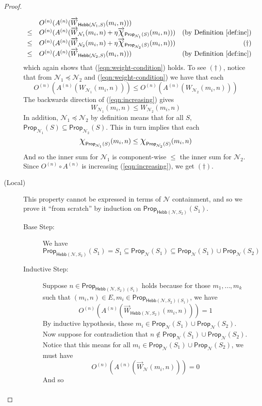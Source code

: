 \documentclass[letterpaper]{article}
\theoremstyle{definition}
\newcommand*{\bigchi}{\mbox{\Large$\chi$}}%
\newcommand{\Prop}{\textsf{Prop}}
\newcommand{\Inc}{\textsf{Hebb}}
\newcommand{\Net}{\mathcal{N}}
\begin{document}
\begin{proof}
\begin{description}
\[\begin{array}{llr}
    &
    O^{(n)}(A^{(n)}(\overrightarrow{W}_{\Inc(\Net_1, S)}(m_i, n))) & 
    \\
    
    \leq &
    O^{(n)}(A^{(n)}(\overrightarrow{W}_{\Net_1}(m_i, n) + \eta \overrightarrow{\bigchi}_{\Prop_{\Net_1}(S)}(m_i, n))) & 
    \mbox{(by Definition~\ref{def:inc})}\\
    
    \leq &
    O^{(n)}(A^{(n)}(\overrightarrow{W}_{\Net_2}(m_i, n) + \eta \overrightarrow{\bigchi}_{\Prop_{\Net_2}(S)}(m_i, n))) & 
    (\dagger)\\
    
    \leq &
    O^{(n)}(A^{(n)}(\overrightarrow{W}_{\Inc(\Net_2, S)}(m_i, n))) & 
    \mbox{(by Definition~\ref{def:inc})}
    \end{array}
    \]
    which again shows that (\ref{eqn:weight-condition}) holds.  To see $(\dagger)$, notice that from $\Net_1 \preceq \Net_2$ and (\ref{eqn:weight-condition}) we have that each
    \[
    O^{(n)}(A^{(n)}(W_{\Net_1}(m_i, n))) \leq O^{(n)}(A^{(n)}(W_{\Net_2}(m_i, n)))
    \]
    The backwards direction of (\ref{eqn:increasing}) gives
    \[
    W_{\Net_1}(m_i, n) \leq W_{\Net_2}(m_i, n)
    \]
    In addition, $\Net_1 \preceq \Net_2$ by definition means that for all $S$, $\Prop_{\Net_1}(S) \subseteq \Prop_{\Net_2}(S)$.  This in turn implies that each
    \[
    \bigchi_{\Prop_{\Net_1}(S)}(m_i, n) \leq \bigchi_{\Prop_{\Net_2}(S)}(m_i, n)
    \]
    And so the inner sum for $\Net_1$ is component-wise $\leq$ the inner sum for $\Net_2$.  Since ${O^{(n)} \circ A^{(n)}}$ is increasing (\ref{eqn:increasing}), we get $(\dagger)$.
    
    \item[(Local)]
    This property cannot be expressed in terms of $\Net$ containment, and so we prove it ``from scratch'' by induction on $\Prop_{\Inc(\Net, S_2)}(S_1)$.
    
    \begin{description}
    \item[Base Step:] We have
    \[
    \Prop_{\Inc(\Net, S_2)}(S_1) = S_1 \subseteq \Prop_\Net(S_1) \subseteq \Prop_\Net(S_1) \cup \Prop_\Net(S_2)
    \]
    
    \item[Inductive Step:]
    Suppose $n \in \Prop_{\Inc(\Net, S_2)(S_1)}$ holds because for those $m_1, \ldots, m_k$ such that $(m_i, n) \in E, m_i \in \Prop_{\Inc(\Net, S_2)(S_1)}$, we have
    \[
    O^{(n)}(A^{(n)}(\overrightarrow{W}_{\Inc(\Net, S_2)}(m_i, n))) = 1
    \]
    By inductive hypothesis, these $m_i \in \Prop_\Net(S_1) \cup \Prop_\Net(S_2)$.  Now suppose for contradiction that $n \not \in \Prop_\Net(S_1) \cup \Prop_\Net(S_2)$.  Notice that this means for all $m_i \in \Prop_\Net(S_1) \cup \Prop_\Net(S_2)$, we must have
    \[
    O^{(n)}(A^{(n)}(\overrightarrow{W}_{\Net}(m_i, n))) = 0
    \]
    And so
    \[
    \begin{array}{lclr}
    

\end{array}\]
\end{description}
\end{description}
\end{proof}
\end{document}
